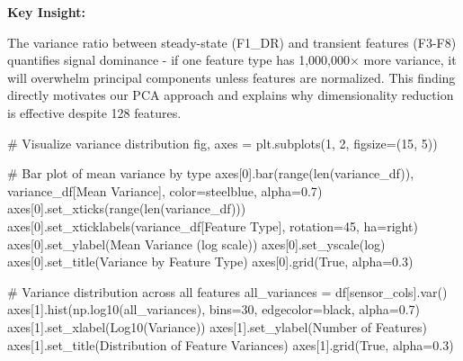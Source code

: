 \documentclass[
  letterpaper,
  DIV=11,
  numbers=noendperiod]{scrartcl}
\newenvironment{Shaded}{\begin{snugshade}}{\end{snugshade}}
\newcommand{\BuiltInTok}[1]{\textcolor[rgb]{0.00,0.23,0.31}{#1}}
\newcommand{\CommentTok}[1]{\textcolor[rgb]{0.37,0.37,0.37}{#1}}
\newcommand{\DecValTok}[1]{\textcolor[rgb]{0.68,0.00,0.00}{#1}}
\newcommand{\FloatTok}[1]{\textcolor[rgb]{0.68,0.00,0.00}{#1}}
\newcommand{\NormalTok}[1]{\textcolor[rgb]{0.00,0.23,0.31}{#1}}
\newcommand{\OperatorTok}[1]{\textcolor[rgb]{0.37,0.37,0.37}{#1}}
\newcommand{\StringTok}[1]{\textcolor[rgb]{0.13,0.47,0.30}{#1}}
\newcommand{\VariableTok}[1]{\textcolor[rgb]{0.07,0.07,0.07}{#1}}
\renewenvironment{Shaded}{%
  \begin{tcolorbox}[%
    enhanced,%
    colback=codebg,%
    colframe=codebg,%
    borderline west={3pt}{0pt}{sectionblue},%
    fontupper=\small\ttfamily,%
    boxrule=0pt,%
    arc=0pt,%
    boxsep=5pt,%
    left=2mm,%
    right=2mm,%
    top=2mm,%
    bottom=2mm%
  ]%
}{%
  \end{tcolorbox}%
}
\begin{document}
\textbf{Key Insight:}

The variance ratio between steady-state (F1\_DR) and transient features
(F3-F8) quantifies signal dominance - if one feature type has 1,000,000×
more variance, it will overwhelm principal components unless features
are normalized. This finding directly motivates our PCA approach and
explains why dimensionality reduction is effective despite 128 features.

\begin{Shaded}
\begin{Highlighting}[]
\CommentTok{\# Visualize variance distribution}
\NormalTok{fig, axes }\OperatorTok{=}\NormalTok{ plt.subplots(}\DecValTok{1}\NormalTok{, }\DecValTok{2}\NormalTok{, figsize}\OperatorTok{=}\NormalTok{(}\DecValTok{15}\NormalTok{, }\DecValTok{5}\NormalTok{))}

\CommentTok{\# Bar plot of mean variance by type}
\NormalTok{axes[}\DecValTok{0}\NormalTok{].bar(}\BuiltInTok{range}\NormalTok{(}\BuiltInTok{len}\NormalTok{(variance\_df)), variance\_df[}\StringTok{\textquotesingle{}Mean Variance\textquotesingle{}}\NormalTok{], }
\NormalTok{           color}\OperatorTok{=}\StringTok{\textquotesingle{}steelblue\textquotesingle{}}\NormalTok{, alpha}\OperatorTok{=}\FloatTok{0.7}\NormalTok{)}
\NormalTok{axes[}\DecValTok{0}\NormalTok{].set\_xticks(}\BuiltInTok{range}\NormalTok{(}\BuiltInTok{len}\NormalTok{(variance\_df)))}
\NormalTok{axes[}\DecValTok{0}\NormalTok{].set\_xticklabels(variance\_df[}\StringTok{\textquotesingle{}Feature Type\textquotesingle{}}\NormalTok{], rotation}\OperatorTok{=}\DecValTok{45}\NormalTok{, ha}\OperatorTok{=}\StringTok{\textquotesingle{}right\textquotesingle{}}\NormalTok{)}
\NormalTok{axes[}\DecValTok{0}\NormalTok{].set\_ylabel(}\StringTok{\textquotesingle{}Mean Variance (log scale)\textquotesingle{}}\NormalTok{)}
\NormalTok{axes[}\DecValTok{0}\NormalTok{].set\_yscale(}\StringTok{\textquotesingle{}log\textquotesingle{}}\NormalTok{)}
\NormalTok{axes[}\DecValTok{0}\NormalTok{].set\_title(}\StringTok{\textquotesingle{}Variance by Feature Type\textquotesingle{}}\NormalTok{)}
\NormalTok{axes[}\DecValTok{0}\NormalTok{].grid(}\VariableTok{True}\NormalTok{, alpha}\OperatorTok{=}\FloatTok{0.3}\NormalTok{)}

\CommentTok{\# Variance distribution across all features}
\NormalTok{all\_variances }\OperatorTok{=}\NormalTok{ df[sensor\_cols].var()}
\NormalTok{axes[}\DecValTok{1}\NormalTok{].hist(np.log10(all\_variances), bins}\OperatorTok{=}\DecValTok{30}\NormalTok{, edgecolor}\OperatorTok{=}\StringTok{\textquotesingle{}black\textquotesingle{}}\NormalTok{, alpha}\OperatorTok{=}\FloatTok{0.7}\NormalTok{)}
\NormalTok{axes[}\DecValTok{1}\NormalTok{].set\_xlabel(}\StringTok{\textquotesingle{}Log10(Variance)\textquotesingle{}}\NormalTok{)}
\NormalTok{axes[}\DecValTok{1}\NormalTok{].set\_ylabel(}\StringTok{\textquotesingle{}Number of Features\textquotesingle{}}\NormalTok{)}
\NormalTok{axes[}\DecValTok{1}\NormalTok{].set\_title(}\StringTok{\textquotesingle{}Distribution of Feature Variances\textquotesingle{}}\NormalTok{)}
\NormalTok{axes[}\DecValTok{1}\NormalTok{].grid(}\VariableTok{True}\NormalTok{, alpha}\OperatorTok{=}\FloatTok{0.3}\NormalTok{)}


\end{Highlighting}
\end{Shaded}
\end{document}

